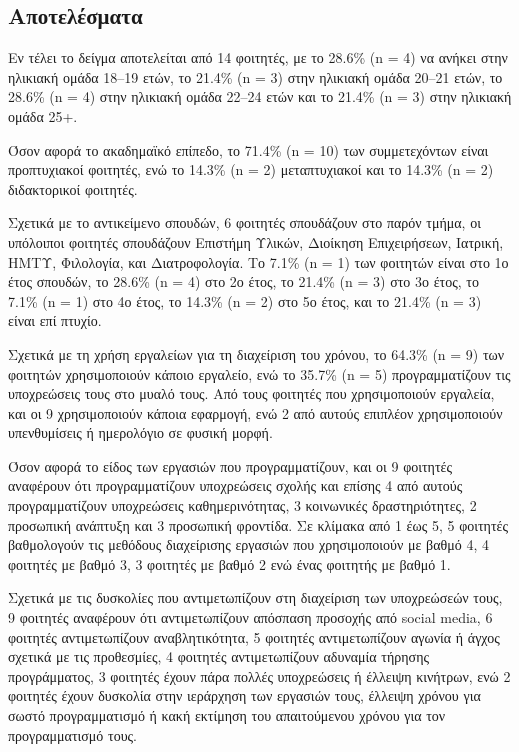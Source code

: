         \subsection{Αποτελέσματα}
            Εν τέλει το δείγμα αποτελείται από 14 φοιτητές, με το 28.6\% (n = 4) να ανήκει στην ηλικιακή ομάδα 18--19 ετών, το 21.4\% (n = 3) στην ηλικιακή ομάδα 20--21 ετών, το 28.6\% (n = 4) στην ηλικιακή ομάδα 22--24 ετών και το 21.4\% (n = 3) στην ηλικιακή ομάδα 25+.

            Όσον αφορά το ακαδημαϊκό επίπεδο, το 71.4\% (n = 10) των συμμετεχόντων είναι προπτυχιακοί φοιτητές, ενώ το 14.3\% (n = 2) μεταπτυχιακοί και το 14.3\% (n = 2) διδακτορικοί φοιτητές.

            Σχετικά με το αντικείμενο σπουδών, 6 φοιτητές σπουδάζουν στο παρόν τμήμα, οι υπόλοιποι φοιτητές σπουδάζουν Επιστήμη Υλικών, Διοίκηση Επιχειρήσεων, Ιατρική, ΗΜΤΥ, Φιλολογία, και Διατροφολογία. Το 7.1\% (n = 1) των φοιτητών είναι στο 1ο έτος σπουδών, το 28.6\% (n = 4) στο 2ο έτος, το 21.4\% (n = 3) στο 3ο έτος, το 7.1\% (n = 1) στο 4ο έτος, το 14.3\% (n = 2) στο 5ο έτος, και το 21.4\% (n = 3) είναι επί πτυχίο.

            Σχετικά με τη χρήση εργαλείων για τη διαχείριση του χρόνου, το 64.3\% (n = 9) των φοιτητών χρησιμοποιούν κάποιο εργαλείο, ενώ το 35.7\% (n = 5) προγραμματίζουν τις υποχρεώσεις τους στο μυαλό τους. Από τους φοιτητές που χρησιμοποιούν εργαλεία, και οι 9 χρησιμοποιούν κάποια εφαρμογή, ενώ 2 από αυτούς επιπλέον χρησιμοποιούν υπενθυμίσεις ή ημερολόγιο σε φυσική μορφή.

            Όσον αφορά το είδος των εργασιών που προγραμματίζουν, και οι 9 φοιτητές αναφέρουν ότι προγραμματίζουν υποχρεώσεις σχολής και επίσης 4 από αυτούς προγραμματίζουν υποχρεώσεις καθημερινότητας, 3 κοινωνικές δραστηριότητες, 2 προσωπική ανάπτυξη και 3 προσωπική φροντίδα. Σε κλίμακα από 1 έως 5, 5 φοιτητές βαθμολογούν τις μεθόδους διαχείρισης εργασιών που χρησιμοποιούν με βαθμό 4, 4 φοιτητές με βαθμό 3, 3 φοιτητές με βαθμό 2 ενώ ένας φοιτητής με βαθμό 1.

            Σχετικά με τις δυσκολίες που αντιμετωπίζουν στη διαχείριση των υποχρεώσεών τους, 9 φοιτητές αναφέρουν ότι αντιμετωπίζουν απόσπαση προσοχής από social media, 6 φοιτητές αντιμετωπίζουν αναβλητικότητα, 5 φοιτητές αντιμετωπίζουν αγωνία ή άγχος σχετικά με τις προθεσμίες, 4 φοιτητές αντιμετωπίζουν αδυναμία τήρησης προγράμματος, 3 φοιτητές έχουν πάρα πολλές υποχρεώσεις ή έλλειψη κινήτρων, ενώ 2 φοιτητές έχουν δυσκολία στην ιεράρχηση των εργασιών τους, έλλειψη χρόνου για σωστό προγραμματισμό ή κακή εκτίμηση του απαιτούμενου χρόνου για τον προγραμματισμό τους.

